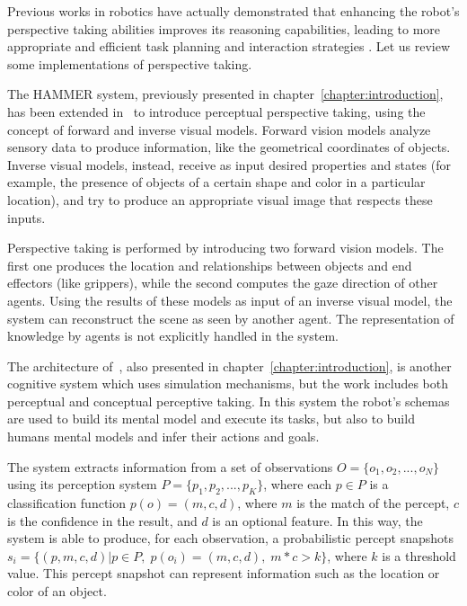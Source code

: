 Previous works in robotics have actually demonstrated that enhancing the robot's perspective taking abilities improves its reasoning capabilities, leading to more appropriate and efficient task planning and interaction strategies \citep{Trafton2005,ros2010one,breazeal2006}. Let us review some implementations of perspective taking.

The HAMMER system, previously presented in chapter~\ref{chapter:introduction}, has been extended in~\cite{johnson2005perceptual} to introduce perceptual perspective taking, using the concept of forward and inverse visual models. Forward vision models analyze sensory data to produce information, like the geometrical coordinates of objects. Inverse visual models, instead, receive as input desired properties and states (for example, the presence of objects of a certain shape and color in a particular location), and try to produce an appropriate visual image that respects these inputs.

Perspective taking is performed by introducing two forward vision models. The first one produces the location and relationships between objects and end effectors (like grippers), while the second  computes the gaze direction of other agents. Using the results of these models as input of an inverse visual model, the system can reconstruct the scene as seen by another agent. The representation of knowledge by agents is not explicitly handled in the system. 

The architecture of~\cite{BreazealGB09}, also presented in chapter~\ref{chapter:introduction}, is another cognitive system which uses simulation mechanisms, but the work  includes both perceptual and conceptual perceptive taking. In this system the robot's schemas are used to build its mental model and execute its tasks, but also to build humans mental models and infer their actions and goals.

The system extracts information from a set of observations $O = \{o_1,o_2,...,o_N\}$ using its perception system $P = \{p_1,p_2,...,p_K\}$, where each $p \in P$ is a classification function $p(o) = (m,c,d)$, where $m$ is the match of the percept, $c$ is the confidence in the result, and $d$ is an optional feature. In this way, the system is able to produce, for each observation, a probabilistic percept snapshots $s_i = \{(p,m,c,d) | p \in P, \; p(o_i) = (m,c,d), \; m*c > k\}$, where $k$ is a threshold value. This percept snapshot can represent information such as the location or color of an object.

